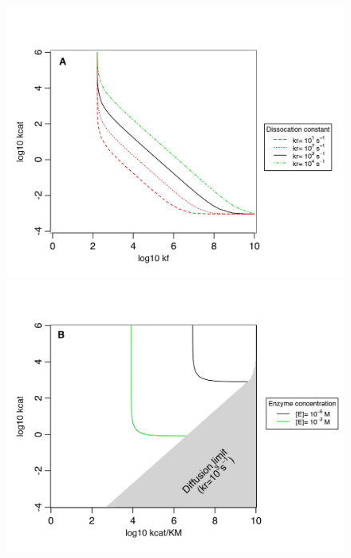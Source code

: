 \begin{figure}[h!]
\centering
\begin{minipage}[c]{0.49\linewidth}
\hspace{0cm}
\includegraphics[scale=0.54,trim=0cm 0cm 0cm 1.5cm,clip]{pics/SM-Enzymes/2DFitLandscape_kr_sens.jpeg} 
\end{minipage} \hspace{0cm}
\begin{minipage}[c]{0.49\linewidth}
\includegraphics[scale=0.54,trim=0cm 0cm 0cm 1.5cm,clip]{pics/SM-Enzymes/Plot2DFitLandscape_Enz_conc_HighFlux.jpeg}

\end{minipage}
\end{figure}
